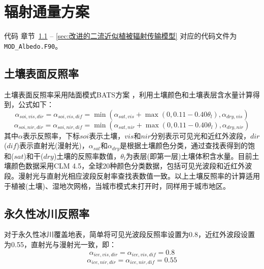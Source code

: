 \chapter{辐射通量方案}

\begin{mymdframed}{代码}
章节~\ref{sec:土壤表面反照率} -- \ref{sec:改进的二流近似植被辐射传输模型} 对应的代码文件为\texttt{MOD\_Albedo.F90}。
\end{mymdframed}


\section{土壤表面反照率}\label{sec:土壤表面反照率}
土壤表面反照率采用陆面模式BATS方案 \citep{dickinson1986biosphere,dickinson1993biosphere}，利用土壤颜色和土壤表层含水量计算得到，公式如下：
\begin{equation}\label{eq:soil_albedo1}
\alpha_{soi,vis,dir}=\alpha_{soi,vis,dif}=\min\left(\alpha_{sat, vis}+\max\left(0,0.11-0.40 \theta_{l}\right), \alpha_{dry, vis}\right)
\end{equation}
%
\begin{equation}
\alpha_{soi,nir,dir}=\alpha_{soi,nir,dif}=\min\left(\alpha_{sat, nir}+\max\left(0,0.11-0.40 \theta_{l}\right), \alpha_{dry, nir}\right)
\end{equation}
其中$\alpha$表示反照率，下标$soi$表示土壤，$vis$和$nir$分别表示可见光和近红外波段，$dir$($dif$)表示直射光(漫射光)，$\alpha_{sat}$和$\alpha_{dry}$是根据土壤颜色分类，通过查找表得到的饱和($sat$)和干($dry$)土壤的反照率数值，$\theta_{l}$为表层(即第一层)土壤体积含水量。目前土壤颜色数据采用CLM 4.5，全球20种颜色分类数据，包括可见光波段和近红外波段。漫射光与直射光相应波段反射率查找表数值一致。以上土壤反照率的计算适用于植被(土壤)、湿地次网格，当城市模式未打开时，同样用于城市地区。


\section{永久性冰川反照率}\label{sec:永久性冰川反照率}
对于永久性冰川覆盖地表，简单将可见光波段反照率设置为0.8，近红外波段设置为0.55，直射光与漫射光一致，即：
\begin{equation}
\alpha_{ice,vis,dir}=\alpha_{ice,vis,dif}=0.8
\end{equation}
%
\begin{equation}
\alpha_{ice,nir,dir}=\alpha_{ice,nir,dif}=0.55
\end{equation}

